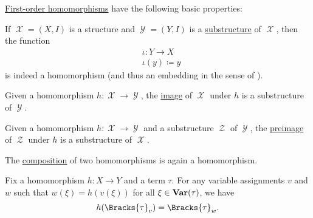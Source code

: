 \begin{proposition}\label{thm:def:first_order_homomorphism}
  \hyperref[def:first_order_homomorphism]{First-order homomorphisms} have the following basic properties:
  \begin{thmenum}
     If \( \mscrX = (X, I) \) is a structure and \( \mscrY = (Y, I) \) is a \hyperref[def:first_order_substructure]{substructure} of \( \mscrX \), then the  function
    \begin{equation}\label{thm:def:first_order_homomorphism/inclusion/canonical_inclusion}
      \begin{aligned}
        &\iota: Y \to X \\
        &\iota(y) \coloneqq y
      \end{aligned}
    \end{equation}
    is indeed a homomorphism (and thus an embedding in the sense of ).

     Given a homomorphism \( h: \mscrX \to \mscrY \), the \hyperref[def:set_valued_map/image]{image} of \( \mscrX \) under \( h \) is a substructure of \( \mscrY \).

     Given a homomorphism \( h: \mscrX \to \mscrY \) and a substructure \( \mscrZ \) of \( \mscrY \), the \hyperref[def:set_valued_map/inverse]{preimage} of \( \mscrZ \) under \( h \) is a substructure of \( \mscrX \).

     The \hyperref[def:set_valued_map/composition]{composition} of two homomorphisms is again a homomorphism.

     Fix a homomorphism \( h: X \to Y \) and a term \( \tau \). For any variable assignments \( v \) and \( w \) such that \( w(\xi) = h(v(\xi)) \) for all \( \xi \in \op*{Var}(\tau) \), we have
    \begin{equation*}
      h(\Bracks{\tau}_v) = \Bracks{\tau}_w.
    \end{equation*}
  \end{thmenum}
\end{proposition}

